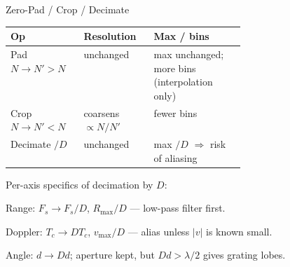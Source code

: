 \begin{multicols}{2}
\begin{sectionbox}{Zero-Pad / Crop / Decimate}
\setlength{\tabcolsep}{3pt}
\renewcommand{\arraystretch}{1.15}
\begin{tabular}{ll>{\raggedright\arraybackslash}p{0.39\linewidth}@{}}
\toprule
\textbf{Op} & \textbf{Resolution} & \textbf{Max / bins} \\
\midrule
Pad $N{\to}N'{>}N$ & unchanged & max unchanged; more bins (interpolation only) \\
Crop $N{\to}N'{<}N$ & coarsens $\propto N/N'$ & fewer bins \\
Decimate $/D$ & unchanged & max $/D$ $\Rightarrow$ risk of aliasing \\
\bottomrule
\end{tabular}
\par\vspace{6pt}
Per-axis specifics of decimation by $D$:
\begin{cheatlist}
\item Range: $F_s \to F_s/D$, $R_{\max}/D$ --- low-pass filter first.
\item Doppler: $T_c \to DT_c$, $v_{\max}/D$ --- alias unless $|v|$ is known small.
\item Angle: $d \to Dd$; aperture kept, but $Dd > \lambda/2$ gives grating lobes.
\end{cheatlist}
\end{sectionbox}

\end{multicols}
\clearpage
\restoregeometry
\setcounter{page}{1}
\normalsize
